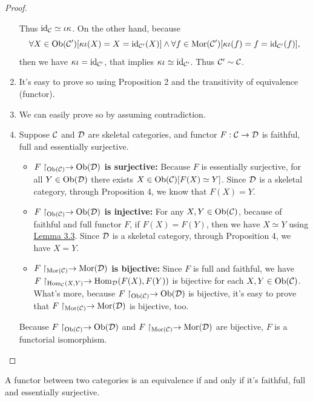 \documentclass{article}
\begin{document}
\begin{proof}
\begin{enumerate}
			Thus $\mathrm{id}_{\mathcal{C}}\simeq\iota\kappa$. On the other hand, because 
				$$\forall X\in\mathrm{Ob}(\mathcal{C}')[\kappa\iota(X)=X=\mathrm{id}_{\mathcal{C}'}(X)]\wedge\forall f\in\mathrm{Mor}(\mathcal{C}')[\kappa\iota(f)=f=\mathrm{id}_{\mathcal{C}'}(f)],$$
			then we have $\kappa\iota=\mathrm{id}_{\mathcal{C}'}$, that implies $\kappa\iota\simeq\mathrm{id}_{\mathcal{C}'}$. Thus $\mathcal{C}'\sim\mathcal{C}$.
		
		\item It's easy to prove so using Proposition 2 and the transitivity of equivalence (functor).
		
		\item We can easily prove so by assuming contradiction.
		
		\item Suppose $\mathcal{C}$ and $\mathcal{D}$ are skeletal categories, and functor $F:\mathcal{C}\to\mathcal{D}$ is faithful, full and essentially surjective. 
			\begin{itemize}
				\item {\bf $F\upharpoonright_{\mathrm{Ob}(\mathcal{C})}\to\mathrm{Ob}(\mathcal{D})$ is surjective:} Because $F$ is essentially surjective, for all $Y\in\mathrm{Ob}(\mathcal{D})$ there exists $X\in\mathrm{Ob}(\mathcal{C})[F(X)\simeq Y]$. Since $\mathcal{D}$ is a skeletal category, through Proposition 4, we know that $F(X)=Y$.
				\item {\bf $F\upharpoonright_{\mathrm{Ob}(\mathcal{C})}\to\mathrm{Ob}(\mathcal{D})$ is injective:} For any $X,Y\in\mathrm{Ob}(\mathcal{C})$, because of faithful and full functor $F$, if $F(X)=F(Y)$, then we have $X\simeq Y$ using \hyperref[func ppt]{Lemma 3.3}. Since $\mathcal{D}$ is a skeletal category, through Proposition 4, we have $X=Y$.
				\item {\bf $F\upharpoonright_{\mathrm{Mor}(\mathcal{C})}\to\mathrm{Mor}(\mathcal{D})$ is bijective:} Since $F$ is full and faithful, we have $F\upharpoonright_{\mathrm{Hom}_{\mathcal{C}}(X,Y)}\to\mathrm{Hom}_{\mathcal{D}}(F(X),F(Y))$ is bijective for each $X,Y\in\mathrm{Ob}(\mathcal{C})$. What's more, because $F\upharpoonright_{\mathrm{Ob}(\mathcal{C})}\to\mathrm{Ob}(\mathcal{D})$ is bijective, it's easy to prove that $F\upharpoonright_{\mathrm{Mor}(\mathcal{C})}\to\mathrm{Mor}(\mathcal{D})$ is bijective, too.
			\end{itemize}
			Because $F\upharpoonright_{\mathrm{Ob}(\mathcal{C})}\to\mathrm{Ob}(\mathcal{D})$ and $F\upharpoonright_{\mathrm{Mor}(\mathcal{C})}\to\mathrm{Mor}(\mathcal{D})$ are bijective, $F$ is a functorial isomorphism.
	\end{enumerate}
\end{proof}


\begin{thm}\label{equ fct}
	A functor between two categories is an equivalence if and only if it's faithful, full and essentially surjective.
\end{thm}
\end{document}
